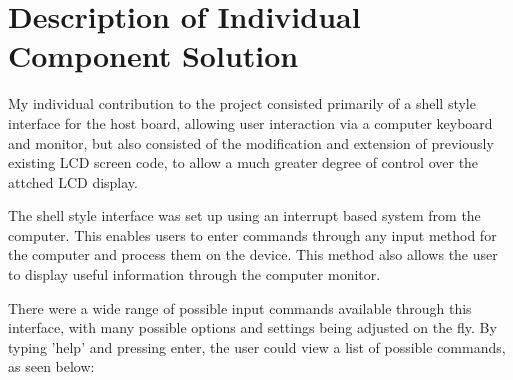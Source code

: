 \section{Description of Individual Component Solution}

My individual contribution to the project consisted primarily of a shell style 
interface for the host board, allowing user interaction via a computer keyboard 
and monitor, but also consisted of the modification and extension of previously 
existing LCD screen code, to allow a much greater degree of control over the 
attched LCD display. 

The shell style interface was set up using an interrupt based system from the 
computer. This enables users to enter commands through any input method for 
the computer and process them on the device. This method also allows the user
to display useful information through the computer monitor.

There were a wide range of possible input commands available through this interface, 
with many possible options and settings being adjusted on the fly. By typing 'help' and 
pressing enter, the user could view a list of possible commands, as seen below: 

